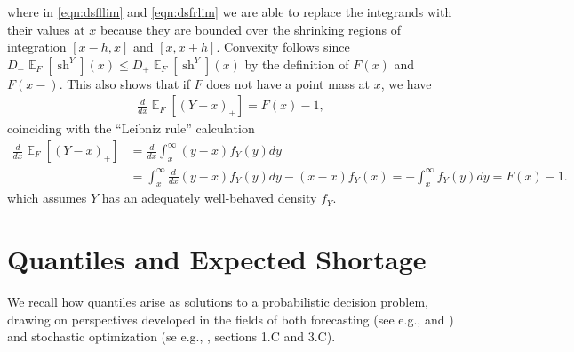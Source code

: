 \documentclass{article}\usepackage[]{graphicx}\usepackage[]{xcolor}
\DeclareMathOperator{\short}{sh}
\DeclareMathOperator{\Ex}{\mathbb{E}}
\begin{document}
where in \eqref{eqn:dsfllim} and \eqref{eqn:dsfrlim} we are able to replace the integrands with their values at $x$ because 
they are bounded over the shrinking regions of integration $[x-h,x]$ and $[x,x+h]$. Convexity follows since 
$D_{-}\Ex_F[\short^Y](x) \leq D_{+}\Ex_F[\short^Y](x)$ by the definition of $F(x)$ and $F(x-)$. This also shows that if $F$ does not 
have a point mass at $x$, we have 
\begin{align}
	\frac{d}{dx} \Ex_F [(Y-x)_{+}] = F(x)-1,
\end{align}
coinciding with the ``Leibniz rule'' calculation
\begin{align}
	\frac{d}{dx} \Ex_F [(Y-x)_{+}] &= \frac{d}{dx} \int_{x}^{\infty} (y-x) f_Y(y)dy \\
	&= \int_{x}^{\infty} \frac{d}{dx}(y-x) f_Y(y)dy - (x-x) f_Y(x) = -\int_{x}^{\infty} f_Y(y)dy = F(x)-1.
\end{align}
which assumes $Y$ has an adequately well-behaved density $f_Y$.


\section{Quantiles and Expected Shortage}
\label{sec:quantiles_shortage}

We recall how quantiles arise as solutions to a probabilistic decision problem, drawing on perspectives developed in the fields of
both forecasting (see e.g., \cite{gneiting2011quantiles} and \cite{jose2009evaluating}) and stochastic optimization 
(se e.g., \cite{royset2022optimization}, sections 1.C and 3.C).
\end{document}
